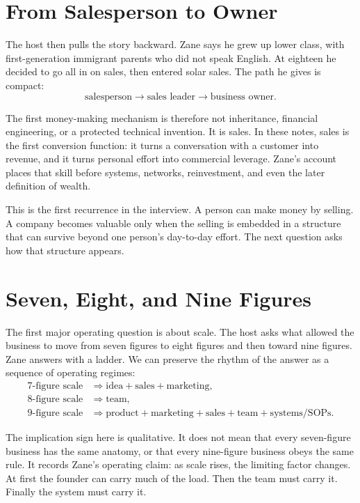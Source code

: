 \section{From Salesperson to Owner}

The host then pulls the story backward. Zane says he grew up lower class, with first-generation immigrant parents who did not speak English. At eighteen he decided to go all in on sales, then entered solar sales. The path he gives is compact:
\begin{equation}
\text{salesperson}\longrightarrow \text{sales leader}\longrightarrow \text{business owner}.
\end{equation}

The first money-making mechanism is therefore not inheritance, financial engineering, or a protected technical invention. It is sales. In these notes, sales is the first conversion function: it turns a conversation with a customer into revenue, and it turns personal effort into commercial leverage. Zane's account places that skill before systems, networks, reinvestment, and even the later definition of wealth.

This is the first recurrence in the interview. A person can make money by selling. A company becomes valuable only when the selling is embedded in a structure that can survive beyond one person's day-to-day effort. The next question asks how that structure appears.

\section{Seven, Eight, and Nine Figures}

The first major operating question is about scale. The host asks what allowed the business to move from seven figures to eight figures and then toward nine figures. Zane answers with a ladder. We can preserve the rhythm of the answer as a sequence of operating regimes:
\begin{align}
7\text{-figure scale} &\Rightarrow \text{idea}+\text{sales}+\text{marketing},\\
8\text{-figure scale} &\Rightarrow \text{team},\\
9\text{-figure scale} &\Rightarrow \text{product}+\text{marketing}+\text{sales}+\text{team}+\text{systems/SOPs}.
\end{align}

The implication sign here is qualitative. It does not mean that every seven-figure business has the same anatomy, or that every nine-figure business obeys the same rule. It records Zane's operating claim: as scale rises, the limiting factor changes. At first the founder can carry much of the load. Then the team must carry it. Finally the system must carry it.

